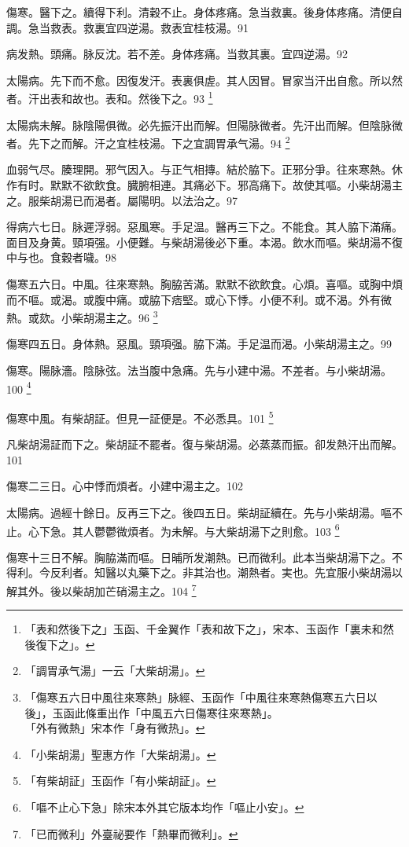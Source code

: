 \documentclass[b5paper,twoside,zihao=-4,UTF8]{ctexbook}
\begin{document}
傷寒。醫下之。續得下利。清穀不止。身体疼痛。急当救裏。後身体疼痛。清便自調。急当救表。救裏宜四逆湯。救表宜桂枝湯。91

病发熱。頭痛。脉反沈。若不差。身体疼痛。当救其裏。宜四逆湯。92

太陽病。先下而不愈。因復发汗。表裏俱虗。其人因冒。冒家当汗出自愈。所以然者。汗出表和故也。表和。然後下之。93
	\footnote{「表和然後下之」玉函、千金翼作「表和故下之」，宋本、玉函作「裏未和然後復下之」。}

太陽病未解。脉陰陽俱微。必先振汗出而解。但陽{脉}微者。先汗出而解。但陰{脉}微者。先下之而解。汗之宜桂枝湯。下之宜{調胃}承气湯。94
	\footnote{「調胃承气湯」一云「大柴胡湯」。}

血弱气尽。腠理開。邪气因入。与正气相摶。結於脇下。正邪分爭。往來寒熱。休作有时。默默不欲飲食。臓腑相連。其痛必下。邪高痛下。故使其嘔。小柴胡湯主之。服柴胡湯已而渴者。屬陽明。以法治之。97

得病六七日。脉遲浮弱。惡風寒。手足温。醫再三下之。不能食。其人脇下滿{痛}。面目及身黄。頸項强。小便難。与柴胡湯後必下重。本渴。飲水而嘔。柴胡{湯}不復中与也。食穀者噦。98

傷寒五六日。中風。往來寒熱。胸脇苦滿。默默不欲飲食。心煩。喜嘔。或胸中煩而不嘔。或渴。或腹中痛。或脇下痞堅。或心下悸。小便不利。或不渴。外有微熱。或欬。小柴胡湯主之。96
	\footnote{「傷寒五六日中風往來寒熱」脉經、玉函作「中風往來寒熱傷寒五六日以後」，玉函此條重出作「中風五六日傷寒往來寒熱」。\\「外有微熱」宋本作「身有微热」。}

傷寒四五日。身{体}熱。惡風。頸項强。脇下滿。手足温而渴。小柴胡湯主之。99

傷寒。陽脉濇。陰脉弦。法当腹中急痛。先与小建中湯。不差者。与小柴胡湯。100
	\footnote{「小柴胡湯」聖惠方作「大柴胡湯」。}

傷寒中風。有柴胡証。但見一証便是。不必悉具。101
	\footnote{「有柴胡証」玉函作「有小柴胡証」。}

凡柴胡湯証而下之。柴胡証不罷者。復与柴胡湯。必蒸蒸而振。卻发熱汗出而解。101

傷寒二三日。心中悸而煩者。小建中湯主之。102

太陽病。過經十餘日。反再三下之。後四五日。柴胡証續在。先与小柴胡湯。嘔不止。心下急。其人鬱鬱微煩者。为未解。与大柴胡湯下之則愈。103
	\footnote{「嘔不止心下急」除宋本外其它版本均作「嘔止小安」。}

傷寒十三日不解。胸脇滿而嘔。日晡所发潮熱{。已}而微利。此本当柴胡湯下之。不得利。今反利者。知醫以丸藥下之。非其治也。潮熱者。実也。先宜服小柴胡湯以解其外。後以柴胡加芒硝湯主之。104
	\footnote{「已而微利」外臺祕要作「熱畢而微利」。}
\end{document}
